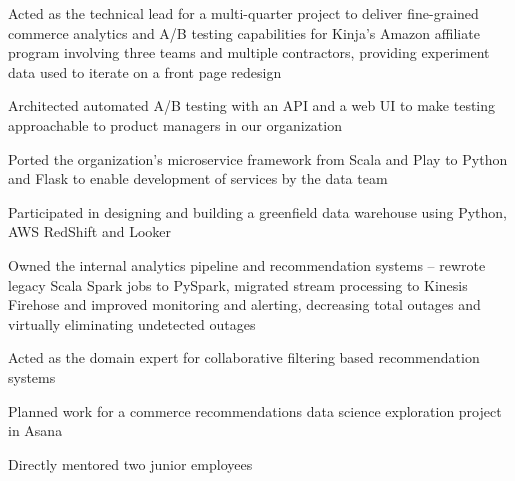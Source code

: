 \begin{job}

  \begin{accomplishments}
    \item Acted as the technical lead for a multi-quarter project to deliver
    fine-grained commerce analytics and A/B testing capabilities for Kinja's
    Amazon affiliate program involving three teams and multiple contractors,
    providing experiment data used to iterate on a front page redesign
    \item Architected automated A/B testing with an API and a web UI to make
    testing approachable to product managers in our organization
    \item Ported the organization's microservice framework from Scala and Play
    to Python and Flask to enable development of services by the data team
    \item Participated in designing and building a greenfield data warehouse
    using Python, AWS RedShift and Looker
    \item Owned the internal analytics pipeline and recommendation systems --
    rewrote legacy Scala Spark jobs to PySpark, migrated stream processing to
    Kinesis Firehose and improved monitoring and alerting, decreasing total
    outages and virtually eliminating undetected outages
    \item Acted as the domain expert for collaborative filtering based
    recommendation systems
    \item Planned work for a commerce recommendations data science exploration
    project in Asana
    \item Directly mentored two junior employees
  \end{accomplishments}
\end{job}
